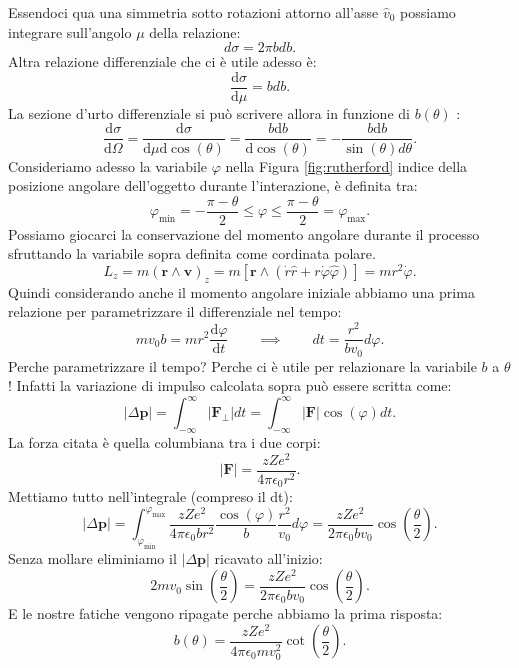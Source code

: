 Essendoci qua una simmetria sotto rotazioni attorno all'asse $\hat{v}_0$ possiamo integrare sull'angolo $\mu$ della relazione:
\[
d\sigma = 2 \pi b db
.\] 
Altra relazione differenziale che ci è utile adesso è: 
\[
\frac{\mbox{d} \sigma}{\mbox{d} \mu} = b db
.\] 
La sezione d'urto differenziale si può scrivere allora in funzione di $b\left( \theta \right)$ :
\[
	\frac{\mbox{d} \sigma}{\mbox{d} \Omega} = \frac{\mbox{d} \sigma}{\mbox{d}\mu \mbox{d}\cos\left( \theta \right) } = \frac{ b \mbox{d}b}{\mbox{d}\cos\left( \theta \right)} = - \frac{b \text{d}b}{ \sin\left( \theta \right) d \theta }  
.\]
Consideriamo adesso la variabile $\varphi$ nella Figura \ref{fig:rutherford} indice della posizione angolare dell'oggetto durante l'interazione, è definita  tra:
\[
\varphi_{\text{min}} = -\frac{\pi - \theta}{2} \le \varphi \le \frac{\pi -\theta}{2} = \varphi_{\text{max}}
.\] 
Possiamo giocarci la conservazione del momento angolare durante il processo sfruttando la variabile sopra definita come cordinata polare.
\[
	L_z = m \left( \boldsymbol{r \wedge \boldsymbol{v}}\right)_z = m \left[ \boldsymbol{r} \wedge   \left( \dot{r} \hat{r} + r \dot{\varphi} \hat{\varphi}\right)\right]=
	mr^2\dot{\varphi}
.\] 
Quindi considerando anche il momento angolare iniziale abbiamo una prima relazione per parametrizzare il differenziale nel tempo:
\[
m v_0 b = m r^2 \frac{\mbox{d} \varphi}{\mbox{d} t} \quad \quad \implies \quad \quad dt = \frac{r^2}{b v_0} d\varphi
.\] 
Perche parametrizzare il tempo? Perche ci è utile per relazionare la variabile $b$ a $\theta$! Infatti la variazione di impulso calcolata sopra può essere scritta come:
\[
\left| \Delta \boldsymbol{p} \right| = \int_{-\infty}^{\infty} \left| \boldsymbol{F}_{\perp}\right| dt = 
\int_{-\infty}^{\infty} \left| \boldsymbol{F}\right| \cos\left( \varphi \right)  dt 
.\]
La forza citata è quella columbiana tra i due corpi:
\[
\left|\boldsymbol{F}\right| = \frac{zZe^2}{4 \pi \epsilon_0 r^2} 
.\] 
Mettiamo tutto nell'integrale (compreso il dt):
\[
	\left| \Delta \boldsymbol{p} \right| = \int_{\varphi_{\text{min}}}^{\varphi_{\text{max}}} \frac{zZe^2}{4 \pi \epsilon_0 b r^2} \frac{\cos\left( \varphi \right) }{b} \frac{r^2}{v_0} d \varphi 
	=  \frac{zZe^2}{2 \pi \epsilon_0 b v_0} \cos\left( \frac{\theta}{2} \right) 
.\] 
Senza mollare eliminiamo il $\left| \Delta \boldsymbol{p} \right|$ ricavato all'inizio:
\[
	2mv_0 \sin\left( \frac{\theta}{2} \right) = \frac{zZe^2}{2 \pi \epsilon_0 b v_0} \cos\left( \frac{\theta}{2} \right) 
.\] 
E le nostre fatiche vengono ripagate perche abbiamo la prima risposta:
\[
	b\left( \theta \right) = \frac{zZe^2}{4 \pi \epsilon_0 m  v_0^2} \cot\left( \frac{\theta}{2} \right) 
.\] 
